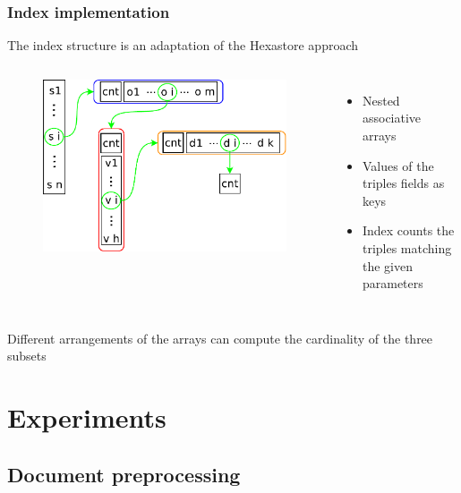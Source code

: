 \documentclass{beamer}
\begin{document}
\begin{frame}
\frametitle{Index implementation}
The index structure is an adaptation of the Hexastore approach
\begin{columns}
\begin{figure}
\includegraphics[scale=0.35]{imgs/index}
\end{figure}
\begin{itemize}
\item Nested associative arrays
\item Values of the triples fields as keys
\item Index counts the triples matching the given parameters
\end{itemize}
\end{columns}
\bigskip
Different arrangements of the arrays can compute the cardinality of the
three subsets
\end{frame}

\section{Experiments}
\subsection{Document preprocessing}
\end{document}
